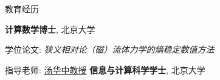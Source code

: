 \begin{rubric}{\songti 教育经历}

\entry*[2016.09 -- 2021.07]%
	\textbf{计算数学博士}, 北京大学\par
	学位论文: \emph{狭义相对论（磁）流体力学的熵稳定数值方法}\par
	指导老师: \href{http://www.math.pku.edu.cn/teachers/tanghz/}{汤华中教授}
%
\entry*[2012.09 -- 2016.07]%
	\textbf{信息与计算科学学士}, 北京大学\par
\end{rubric}


